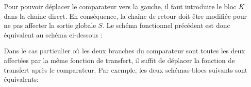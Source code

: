 Pour pouvoir déplacer le comparateur vers la gauche, 
il faut introduire le bloc $K$ dans la chaine direct.
En conséquence, la chaîne de retour doit être modifiée pour ne pas affecter 
la sortie globale $S$. Le schéma fonctionnel précédent est donc équivalent 
au schéma ci-dessous :

\begin{center}
\end{center}


Dans le cas particulier où les deux branches du comparateur sont toutes 
les deux affectées par la même fonction de transfert, il suffit de déplacer 
la fonction de transfert après le comparateur. Par exemple, les deux 
schémas-blocs suivants sont équivalents: 

\begin{center}
\end{center}


